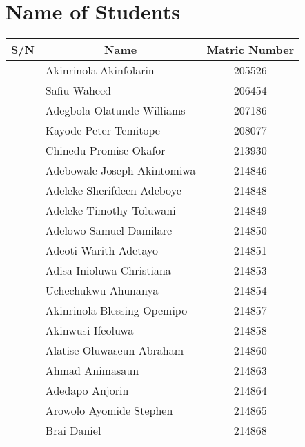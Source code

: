 \documentclass[a4paper]{article}
\newcounter{rowcount}
\newcommand\rownumber{\stepcounter{rowcount}\arabic{rowcount}}
\begin{document}
    \section*{Name of Students}
    \begin{center}
        \Large
        \begin{longtable} { c|l|c }
            \toprule[2pt]
            S/N & \multicolumn{1}{|c|}{Name} & Matric Number \\
            \midrule
            \rownumber\space & Akinrinola Akinfolarin & 205526 \\
            \rownumber\space & Safiu Waheed & 206454 \\
            \rownumber\space & Adegbola Olatunde Williams & 207186 \\
            \rownumber\space & Kayode Peter Temitope & 208077 \\
            \rownumber\space & Chinedu Promise Okafor & 213930 \\
            \rownumber\space & Adebowale Joseph Akintomiwa & 214846 \\
            \rownumber\space & Adeleke Sherifdeen Adeboye & 214848 \\
            \rownumber\space & Adeleke Timothy Toluwani & 214849 \\
            \rownumber\space & Adelowo Samuel Damilare & 214850 \\
            \rownumber\space & Adeoti Warith Adetayo & 214851 \\
            \rownumber\space & Adisa Inioluwa Christiana & 214853 \\
            \rownumber\space & Uchechukwu Ahunanya & 214854 \\
            \rownumber\space & Akinrinola Blessing Opemipo & 214857 \\
            \rownumber\space & Akinwusi Ifeoluwa & 214858 \\
            \rownumber\space & Alatise Oluwaseun Abraham & 214860 \\
            \rownumber\space & Ahmad Animasaun & 214863 \\
            \rownumber\space & Adedapo Anjorin & 214864 \\
            \rownumber\space & Arowolo Ayomide Stephen & 214865 \\
            \rownumber\space & Brai Daniel & 214868 \\

\end{longtable}
\end{center}
\end{document}
